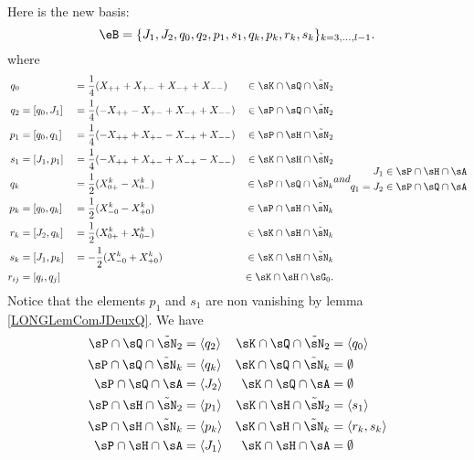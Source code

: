 Here is the new basis:
%
\begin{equation}		\label{LONGEqSuperBaseeB}
	\eB=\{J_1,J_2, q_0,q_2,p_1,s_1,q_k,p_k,r_k,s_k \}_{k=3,\ldots,l-1}.
\end{equation}
%
where
\begin{subequations}		\label{LONGSubEqsBaseSuperTsNTrois}\label{LONGEqDecompqprskXX}
	\begin{align}
		q_0&		&&=\frac{1}{ 4 }(X_{++}+X_{+-}+X_{-+}+X_{--})	&\in\sK\cap\sQ\cap\tilde\sN_2\\
		q_2&=[q_0,J_1]	&&=\frac{1}{ 4 }(-X_{++}-X_{+-}+X_{-+}+X_{--})	&\in\sP\cap\sQ\cap\tilde\sN_2\\
		p_1&=[q_0,q_1]	&&=\frac{1}{ 4 }(-X_{++}+X_{+-}-X_{-+}+X_{--})	&\in\sP\cap\sH\cap\tilde\sN_2	\label{LONGEqqzqupuDef}\\
		s_1&=[J_1,p_1]	&&=\frac{1}{ 4 }(-X_{++}+X_{+-}+X_{-+}-X_{--})	&\in\sK\cap\sH\cap\tilde\sN_2\\
		q_k&		&&=\frac{ 1 }{2}(X_{0+}^k-X_{0-}^k)	&\in\sP\cap\sQ\cap\tilde\sN_k	\\
		p_k&=[q_0,q_k]	&&=\frac{ 1 }{ 2 }(X_{-0}^k-X_{+0}^k)	&\in\sP\cap\sH\cap\tilde\sN_k	\\
		r_k&=[J_2,q_k]	&&=\frac{ 1 }{2}(X^k_{0+}+X^k_{0-})	&\in\sK\cap\sH\cap\tilde\sN_k	\\
		s_k&=[J_1,p_k]	&&=-\frac{ 1 }{2}(X^k_{-0}+X^k_{+0})	&\in\sK\cap\sH\cap\tilde\sN_k	\\
		r_{ij}&=[q_i,q_j]&&					&\in\sK\cap\sH\cap\sG_0.
	\end{align}
and
	\begin{align}
		J_1&\in\sP\cap\sH\cap\sA\\
		q_1=J_2&\in\sP\cap\sQ\cap\sA
	\end{align}
\end{subequations}
Notice that the elements $p_1$ and $s_1$ are non vanishing by lemma \ref{LONGLemComJDeuxQ}. We have 
\begin{subequations}
	\begin{align}
		\sP\cap\sQ\cap\tilde\sN_2&=\langle q_2\rangle	&	\sK\cap\sQ\cap\tilde\sN_2&=\langle q_0\rangle\\
		\sP\cap\sQ\cap\tilde\sN_k&=\langle q_k\rangle	&	\sK\cap\sQ\cap\tilde\sN_k&=\emptyset\\
		\sP\cap\sQ\cap\sA&=\langle J_2\rangle	&	\sK\cap\sQ\cap\sA&= \emptyset\\
		\sP\cap\sH\cap\tilde\sN_2&=\langle p_1\rangle	&	\sK\cap\sH\cap\tilde\sN_2&=\langle s_1\rangle\\
		\sP\cap\sH\cap\tilde\sN_k&=\langle p_k\rangle	&	\sK\cap\sH\cap\tilde\sN_k&=\langle r_k,s_k\rangle\\
		\sP\cap\sH\cap\sA&=\langle J_1\rangle	&	\sK\cap\sH\cap\sA&=\emptyset
	\end{align}
\end{subequations}

